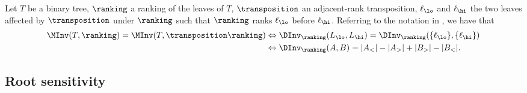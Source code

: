 \begin{proposition}\label{prop:sensitivity:criterion}
Let $T$ be a binary tree, $\ranking$ a ranking of the leaves of $T$, $\transposition$ an adjacent-rank transposition, $\ell_\lo$ and $\ell_\hi$ the two leaves affected by $\transposition$ under $\ranking$ such that $\ranking$ ranks $\ell_\lo$ before $\ell_\hi$. Referring to the notation in , we have that 
\begin{align}
\MInv(T,\ranking) = \MInv(T, \transposition \ranking)
&\Leftrightarrow \DInv_\ranking(L_\lo,L_\hi) = \DInv_\ranking(\{\ell_\lo\},\{\ell_\hi\}) \label{eq:criterion:binary:simple} \\
&\Leftrightarrow \DInv_\ranking(A,B) = |A_<| - |A_>| + |B_>| - |B_<|.
\label{eq:criterion:binary:simple:refined}
\end{align}
\end{proposition}

\subsection{Root sensitivity}
\label{sec:sensitivity:root}

